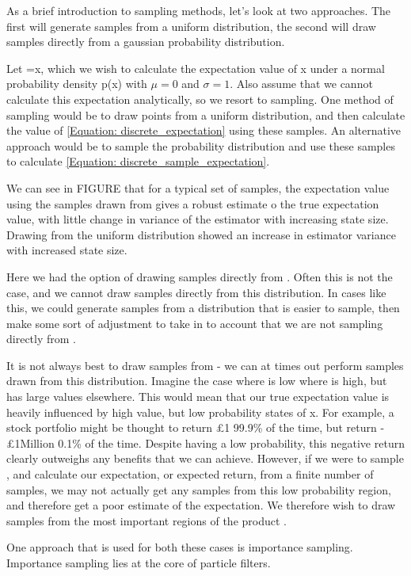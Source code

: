 As a brief introduction to sampling methods, let's look at two approaches. The first will generate samples from a uniform distribution, the second will draw samples directly from a gaussian probability distribution. 

Let \funcx=x, which we wish to calculate the expectation value of x under a normal probability density p(x) with $\mu=0$ and $\sigma=1$. Also assume that we cannot calculate this expectation analytically, so we resort to sampling. One method of sampling would be to draw points from a uniform distribution, and then calculate the value of \eqref{Equation: discrete_expectation} using these samples. An alternative approach would be to sample the probability distribution \probx and use these samples to calculate \eqref{Equation: discrete_sample_expectation}. 

We can see in FIGURE that for a typical set of samples, the expectation value using the samples drawn from \probx gives a robust estimate o the true expectation value, with little change in variance of the estimator with increasing state size. Drawing from the uniform distribution showed an increase in estimator variance with increased state size.

Here we had the option of drawing samples directly from \probx. Often this is not the case, and we cannot draw samples directly from this distribution. In cases like this, we could generate samples from a distribution that is easier to sample, then make some sort of adjustment to take in to account that we are not sampling directly from \probx. 

It is not always best to draw samples from \probx - we can at times out perform samples drawn from this distribution. Imagine the case where \funcx is low where \probx is high, but \funcx has large values elsewhere. This would mean that our true expectation value is heavily influenced by high value, but low probability states of x. For example, a stock portfolio might be thought to return \pounds 1 99.9\% of the time, but return -\pounds 1Million 0.1\% of the time. Despite having a low probability, this negative return clearly outweighs any benefits that we can achieve. However, if we were to sample \probx, and calculate our expectation, or expected return, from a finite number of samples, we may not actually get any samples from this low probability region, and therefore get a poor estimate of the expectation. We therefore wish to draw samples from the most important regions of the product \funcx\probx.

One approach that is used for both these cases is importance sampling. Importance sampling lies at the core of particle filters.

